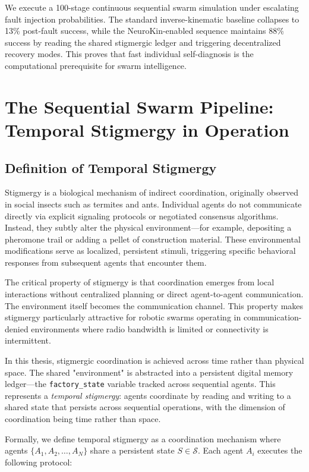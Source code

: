 \documentclass[12pt,a4paper,oneside]{report}
\begin{document}
We execute a 100-stage continuous sequential swarm simulation under escalating fault injection probabilities. The standard inverse-kinematic baseline collapses to 13\% post-fault success, while the NeuroKin-enabled sequence maintains 88\% success by reading the shared stigmergic ledger and triggering decentralized recovery modes. This proves that fast individual self-diagnosis is the computational prerequisite for swarm intelligence.

\section{The Sequential Swarm Pipeline: Temporal Stigmergy in Operation}

\subsection{Definition of Temporal Stigmergy}

Stigmergy is a biological mechanism of indirect coordination, originally observed in social insects such as termites and ants. Individual agents do not communicate directly via explicit signaling protocols or negotiated consensus algorithms. Instead, they subtly alter the physical environment—for example, depositing a pheromone trail or adding a pellet of construction material. These environmental modifications serve as localized, persistent stimuli, triggering specific behavioral responses from subsequent agents that encounter them.

The critical property of stigmergy is that coordination emerges from local interactions without centralized planning or direct agent-to-agent communication. The environment itself becomes the communication channel. This property makes stigmergy particularly attractive for robotic swarms operating in communication-denied environments where radio bandwidth is limited or connectivity is intermittent.

In this thesis, stigmergic coordination is achieved across time rather than physical space. The shared "environment" is abstracted into a persistent digital memory ledger—the \texttt{factory\_state} variable tracked across sequential agents. This represents a \textit{temporal stigmergy}: agents coordinate by reading and writing to a shared state that persists across sequential operations, with the dimension of coordination being time rather than space.

Formally, we define temporal stigmergy as a coordination mechanism where agents $\{A_1, A_2, \ldots, A_N\}$ share a persistent state $S \in \mathcal{S}$. Each agent $A_i$ executes the following protocol:
\end{document}
